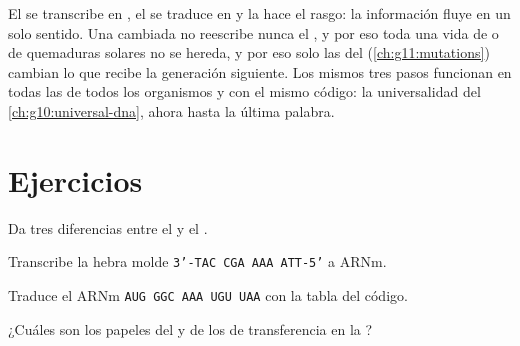 \begin{remark}\label{rem:g11:gene-expression:flow}
El  se transcribe en , el  se traduce en  y la
 hace el rasgo: la información fluye en un solo sentido. Una
 cambiada no reescribe nunca el , y por eso toda una vida de
 o de quemaduras solares no se hereda, y por eso solo las
 del  (\cref{ch:g11:mutations}) cambian lo que recibe la
generación siguiente. Los mismos tres pasos funcionan en todas las
 de todos los organismos y con el mismo código: la
universalidad del \cref{ch:g10:universal-dna}, ahora hasta la última
palabra.
\end{remark}

\section{Ejercicios}

\begin{exercise}[$\star$]\label{exo:g11:gene-expression:1}
Da tres diferencias entre el  y el .
\end{exercise}

\begin{exercise}[$\star$]\label{exo:g11:gene-expression:2}
Transcribe la hebra molde \texttt{3'-TAC CGA AAA ATT-5'} a ARNm.
\end{exercise}

\begin{exercise}[$\star$]\label{exo:g11:gene-expression:3}
Traduce el ARNm \texttt{AUG GGC AAA UGU UAA} con la tabla del código.
\end{exercise}

\begin{exercise}[$\star$]\label{exo:g11:gene-expression:4}
¿Cuáles son los papeles del  y de los  de transferencia en
la ?
\end{exercise}

